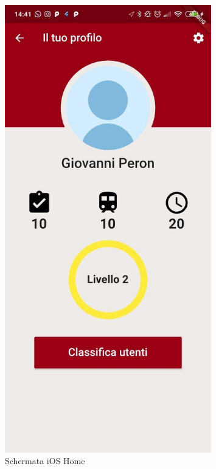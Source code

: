 \begin{minipage}{0.45\textwidth}
\begin{figure}[H]
	\centering
	\includegraphics[width=0.8\textwidth]{immagini/profile.jpg}
	\caption{Schermata iOS Home}
\end{figure}
\end{minipage}

